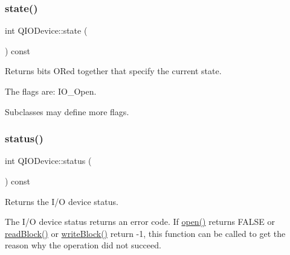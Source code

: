 \mbox{\label{class_q_i_o_device_a8529428353a81543a5a460797bf01c21}} 
\subsubsection{\texorpdfstring{state()}{state()}}
{\footnotesize\ttfamily int Q\+I\+O\+Device\+::state (\begin{DoxyParamCaption}{ }\end{DoxyParamCaption}) const\hspace{0.3cm}{\ttfamily [inline]}}

Returns bits OR\textquotesingle{}ed together that specify the current state.

The flags are\+: {\ttfamily I\+O\+\_\+\+Open}.

Subclasses may define more flags. \mbox{\label{class_q_i_o_device_aa9079e73ab2403922c528523cdf2d4ef}} 
\subsubsection{\texorpdfstring{status()}{status()}}
{\footnotesize\ttfamily int Q\+I\+O\+Device\+::status (\begin{DoxyParamCaption}{ }\end{DoxyParamCaption}) const\hspace{0.3cm}{\ttfamily [inline]}}

Returns the I/O device status.

The I/O device status returns an error code. If \mbox{\hyperlink{class_q_i_o_device_ae4046ae7bf4d4cee1010239973314e42}{open()}} returns F\+A\+L\+SE or \mbox{\hyperlink{class_q_i_o_device_a71f10647e4bd98141f45362b9a06983a}{read\+Block()}} or \mbox{\hyperlink{class_q_i_o_device_a5d937df1bde2f956872dd54e077807d1}{write\+Block()}} return -\/1, this function can be called to get the reason why the operation did not succeed.

